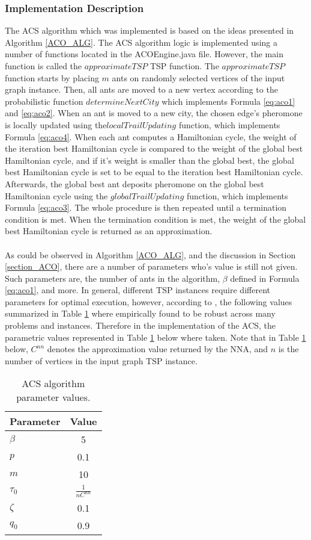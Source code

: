 \documentclass{article}
\begin{document}
\subsubsection{Implementation Description}
\label{acs_impl}
The ACS algorithm which was implemented is based on the ideas presented in Algorithm \ref{ACO_ALG}. The ACS algorithm logic is implemented using a number of functions located in the ACOEngine.java file. However, the main function is called the $approximateTSP$ TSP function. The $approximateTSP$ function starts by placing $m$ ants on randomly selected vertices of the input graph instance. Then, all ants are moved to a new vertex according to the probabilistic function $determineNextCity$ which implements Formula \ref{eq:aco1} and \ref{eq:aco2}. When an ant is moved to a new city, the chosen edge's pheromone is locally updated using the$localTrailUpdating$ function, which implements Formula \ref{eq:aco4}. When each ant computes a Hamiltonian cycle, the weight of the iteration best Hamiltonian cycle is compared to the weight of the global best Hamiltonian cycle, and if it's weight is smaller than the global best, the global best Hamiltonian cycle is set to be equal to the iteration best Hamiltonian cycle. Afterwards, the global best ant deposits pheromone on the global best Hamiltonian cycle using the $globalTrailUpdating$ function, which implements Formula \ref{eq:aco3}. The whole procedure is then repeated until a termination condition is met. When the termination condition is met, the weight of the global best Hamiltonian cycle is returned as an approximation.\\\\
As could be observed in Algorithm \ref{ACO_ALG}, and the discussion in Section \ref{section_ACO}, there are a number of parameters who's value is still not given. Such parameters are, the number of ants in the algorithm, $\beta$ defined in Formula \ref{eq:aco1}, and more. In general, different TSP instances require different parameters for optimal execution, however, according to \cite{dorigo_stutzle_thomas_2004}, the following values summarized in Table \ref{tab:param} where empirically found to be robust across many problems and instances. Therefore in the implementation of the ACS, the parametric values represented in Table \ref{tab:param} below where taken. Note that in Table \ref{tab:param} below, $C^{nn}$ denotes the approximation value returned by the NNA, and $n$ is the number of vertices in the input graph TSP instance.
\begin{table}[H]
    \caption{ACS algorithm parameter values.}
    \centering
    \label{tab:param}
    \begin{tabular}{l|c|} %
      \textbf{Parameter} & \textbf{Value}\\
      \hline
    $\beta$ & 5\\
    $p$ & 0.1\\
    $m$ & 10\\
    $\tau_0$ & $\frac{1}{nC^{nn}}$\\
    $\zeta$ & 0.1\\
    $q_0$  & 0.9
    \end{tabular}
\end{table}
\end{document}
